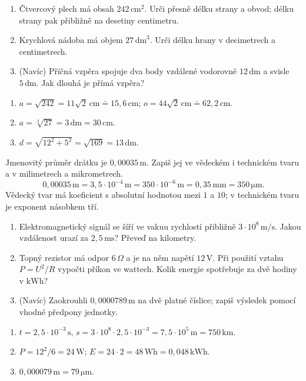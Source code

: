 \documentclass[11pt,a4paper]{article}
\begin{document}
\begin{zadaniReseniBox}[title={Samostatná práce 1}]
\begin{enumerate}[label=\alph*)]
\item Čtvercový plech má obsah $242\,\mathrm{cm}^2$. Urči přesně délku
strany a obvod; délku strany pak přibližně na desetiny centimetru.
\item Krychlová nádoba má objem $27\,\mathrm{dm}^3$.
Urči délku hrany v decimetrech a centimetrech.
\item (Navíc) Příčná vzpěra spojuje dva body vzdálené vodorovně $12\,\mathrm{dm}$
a svisle $5\,\mathrm{dm}$. Jak dlouhá je přímá vzpěra?
\end{enumerate}
\tcblower
\begin{enumerate}[label=\alph*)]
\item $a=\sqrt{242}=11\sqrt2\,\mathrm{cm}\doteq15{,}6\,\mathrm{cm}$;
$o=44\sqrt2\,\mathrm{cm}\doteq62{,}2\,\mathrm{cm}$.
\item $a=\sqrt[3]{27}=3\,\mathrm{dm}=30\,\mathrm{cm}$.
\item $d=\sqrt{12^2+5^2}=\sqrt{169}=13\,\mathrm{dm}$.
\end{enumerate}
\end{zadaniReseniBox}

\begin{prikladReseniBox}[title={Příklad 2}]
Jmenovitý průměr drátku je $0{,}00035\,\mathrm m$.
Zapiš jej ve vědeckém i technickém tvaru a v milimetrech a mikrometrech.
\tcblower
\[
0{,}00035\,\mathrm m=3{,}5\cdot10^{-4}\,\mathrm m
=350\cdot10^{-6}\,\mathrm m
=0{,}35\,\mathrm{mm}=350\,\mathrm{\mu m}.
\]
Vědecký tvar má koeficient s absolutní hodnotou mezi $1$ a $10$;
v technickém tvaru je exponent násobkem tří.
\end{prikladReseniBox}

\begin{zadaniReseniBox}[title={Samostatná práce 2}]
\begin{enumerate}[label=\alph*)]
\item Elektromagnetický signál se šíří ve vakuu rychlostí přibližně
$3\cdot10^8\,\mathrm{m/s}$. Jakou vzdálenost urazí za $2{,}5\,\mathrm{ms}$?
Převeď na kilometry.
\item Topný rezistor má odpor $6\,\Omega$ a je na něm napětí $12\,\mathrm V$.
Při použití vztahu $P=U^2/R$ vypočti příkon ve wattech.
Kolik energie spotřebuje za dvě hodiny v \(\mathrm{kWh}\)?
\item (Navíc) Zaokrouhli $0{,}0000789\,\mathrm m$ na dvě platné číslice;
zapiš výsledek pomocí vhodné předpony jednotky.
\end{enumerate}
\tcblower
\begin{enumerate}[label=\alph*)]
\item $t=2{,}5\cdot10^{-3}\,\mathrm s$,
$s=3\cdot10^8\cdot2{,}5\cdot10^{-3}=7{,}5\cdot10^5\,\mathrm m=750\,\mathrm{km}$.
\item $P=12^2/6=24\,\mathrm W$;
$E=24\cdot2=48\,\mathrm{Wh}=0{,}048\,\mathrm{kWh}$.
\item $0{,}000079\,\mathrm m=79\,\mathrm{\mu m}$.
\end{enumerate}
\end{zadaniReseniBox}
\end{document}
